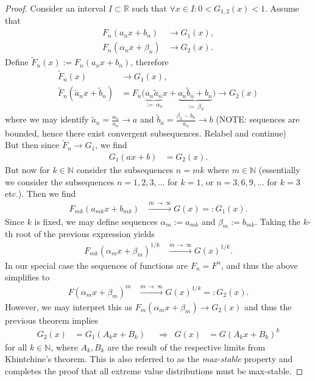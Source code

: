 \documentclass[english, parskip=full]{scrartcl}
\begin{document}
\begin{proof}
Consider an interval $I\subset\mathbb{R}$ such that $\forall x\in I: 0 < G_{1,2}(x) < 1$.
Assume that
\begin{align}
F_n(a_nx + b_n) &\rightarrow G_1(x),\\
F_n(\alpha_nx + \beta_n) &\rightarrow G_2(x).
\end{align}
Define $\tilde{F}_n(x) := F_n(a_nx + b_n)$, therefore
\begin{align}
\tilde{F}_n(x) &\rightarrow G_1(x),\\
\tilde{F}_n(\tilde{a}_n x + \tilde{b}_n) &= F_n\big( \underbrace{a_n \tilde{a}_n}_{:=\ \alpha_n} x + \underbrace{a_n \tilde{b}_n + b_n}_{:=\ \beta_n} \big) \rightarrow G_2(x)
\end{align}
where we may identify $\tilde{a}_n = \frac{\alpha_n}{a_n} \rightarrow a$ and $\tilde{b}_n = \frac{\beta_n - b_n}{a_n} \rightarrow b$ (NOTE: sequences are bounded, hence there exist convergent subsequences. Relabel and continue)\\
But then since $\tilde{F}_n \rightarrow G_1$, we find
\begin{align}
G_1(ax + b) &= G_2(x).
\end{align}
But now for $k\in\mathbb{N}$ consider the subsequences $n = mk$ where $m\in\mathbb{N}$ (essentially we consider the subsequences $n=1,2,3,\dots$ for $k=1$, or $n=3,6,9,\dots$ for $k=3$ etc.).
Then we find 
\begin{align}
F_{mk}(a_{mk}x + b_{mk}) &\overset{m\,\rightarrow\,\infty}{\longrightarrow} G(x) =: G_1(x).
\end{align}
Since $k$ is fixed, we may define sequences $\alpha_m := a_{mk}$ and $\beta_m := b_{mk}$.
Taking the $k$-th root of the previous expression yields
\begin{align}
F_{mk}(\alpha_mx + \beta_m)^{1/k} &\overset{m\,\rightarrow\,\infty}{\longrightarrow} G(x)^{1/k}.
\end{align}
In our special case the sequences of functions are $F_n=F^n$, and thus the above simplifies to
\begin{align}
F(\alpha_mx + \beta_m)^m &\overset{m\,\rightarrow\,\infty}{\longrightarrow} G(x)^{1/k} =: G_2(x).
\end{align}
However, we may interpret this as $F_m(\alpha_mx + \beta_m) \rightarrow G_2(x)$ and thus the previous theorem implies
\begin{align}
G_2(x) &= G_1(A_kx + B_k) && \Rightarrow & G(x) &= G(A_kx + B_k)^k
\end{align}
for all $k\in\mathbb{N}$, where $A_k,B_k$ are the result of the respective limits from Khintchine's theorem.
This is also referred to as the \emph{max-stable} property and completes the proof that all extreme value distributions must be max-stable.
\end{proof}
\end{document}
